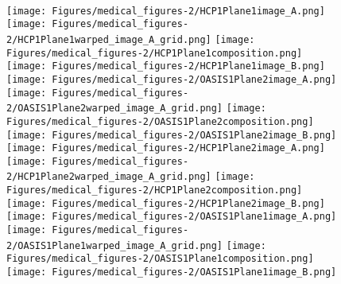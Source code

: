 \begin{figure}
{	 	
        \\
	 	\texttt{[image: Figures/medical\_figures-2/HCP1Plane1image\_A.png]}
	 	\texttt{[image: Figures/medical\_figures-2/HCP1Plane1warped\_image\_A\_grid.png]}
	 	\texttt{[image: Figures/medical\_figures-2/HCP1Plane1composition.png]}
	 	\texttt{[image: Figures/medical\_figures-2/HCP1Plane1image\_B.png]}
	 	\texttt{[image: Figures/medical\_figures-2/OASIS1Plane2image\_A.png]}
	 	\texttt{[image: Figures/medical\_figures-2/OASIS1Plane2warped\_image\_A\_grid.png]}
	 	\texttt{[image: Figures/medical\_figures-2/OASIS1Plane2composition.png]}
	 	\texttt{[image: Figures/medical\_figures-2/OASIS1Plane2image\_B.png]}
        \\
	 	\texttt{[image: Figures/medical\_figures-2/HCP1Plane2image\_A.png]}
	 	\texttt{[image: Figures/medical\_figures-2/HCP1Plane2warped\_image\_A\_grid.png]}
	 	\texttt{[image: Figures/medical\_figures-2/HCP1Plane2composition.png]}
	 	\texttt{[image: Figures/medical\_figures-2/HCP1Plane2image\_B.png]}
	 	\texttt{[image: Figures/medical\_figures-2/OASIS1Plane1image\_A.png]}
	 	\texttt{[image: Figures/medical\_figures-2/OASIS1Plane1warped\_image\_A\_grid.png]}
	 	\texttt{[image: Figures/medical\_figures-2/OASIS1Plane1composition.png]}
	 	\texttt{[image: Figures/medical\_figures-2/OASIS1Plane1image\_B.png]}
        \\
}
\end{figure}
